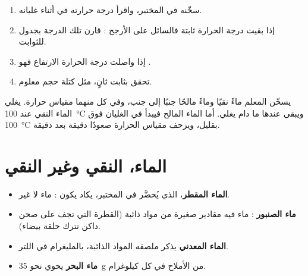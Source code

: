 \begin{method}\label{met:g6:pure-substances-and-mixtures:identify}
\begin{enumerate}
  \item سخّنه في المختبر، واقرأ درجة حرارته في أثناء
        غليانه.
  \item إذا بقيت درجة الحرارة ثابتة فالسائل على الأرجح :
        قارن تلك الدرجة بجدول للثوابت.
  \item إذا واصلت درجة الحرارة الارتفاع فهو .
  \item تحقق بثابت ثانٍ، مثل كتلة حجم
        معلوم.
\end{enumerate}
\end{method}

\begin{inthelab}
يسخّن المعلم ماءً نقيًا وماءً مالحًا جنبًا إلى جنب، وفي كل منهما مقياس
حرارة. يغلي الماء النقي عند \qty{100}{\celsius} ويبقى عندها ما دام يغلي.
أما الماء المالح فيبدأ في الغليان فوق \qty{100}{\celsius} بقليل، ويزحف
مقياس الحرارة صعودًا دقيقة بعد دقيقة.
\end{inthelab}

\section{الماء، النقي وغير النقي}

\begin{example}\label{ex:g6:pure-substances-and-mixtures:waters}
\begin{itemize}
  \item \textbf{الماء المقطر}، الذي يُحضَّر في المختبر، يكاد يكون : ماء لا غير.
  \item \textbf{ماء الصنبور} : ماء فيه مقادير صغيرة من مواد
        ذائبة (القطرة التي تجف على صحن داكن تترك حلقة
        بيضاء).
  \item \textbf{الماء المعدني}  يذكر ملصقه المواد الذائبة،
        بالمليغرام في اللتر.
  \item \textbf{ماء البحر}  يحوي نحو
        \qty{35}{g} من الأملاح في كل كيلوغرام.
\end{itemize}
\end{example}

